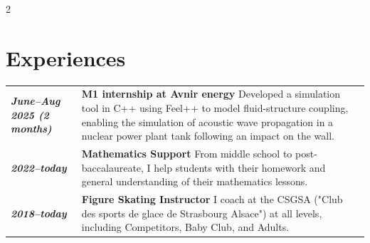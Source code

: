 \documentclass[lighthipster]{latex_for_CV/simplehipstercv}
\begin{document}
\begin{paracol}{2}















\vspace{0.3cm}



\small
\section*{Experiences}

\begin{tabular}{>{\raggedleft\arraybackslash}p{2.5cm} | >{\footnotesize}p{} c}
    \textit{{\textbf{\color{gray!130} June--Aug 2025 (2 months)}}} & {\small\textbf{M1 internship at Avnir energy}} \newline Developed a simulation tool in C++ using Feel++ to model fluid-structure coupling, enabling the simulation of acoustic wave propagation in a nuclear power plant tank following an impact on the wall.  & \\[1.05cm]
    \textit{{\textbf{\color{gray!130} 2022--today}}} & {\small\textbf{ Mathematics Support}} \newline From middle school to post-baccalaureate, I help students with their homework and general understanding of their mathematics lessons. & \\[0.75cm]
    \textit{{\textbf{\color{gray!130} 2018--today}}} & {\small\textbf{ Figure Skating Instructor}} \newline I coach at the CSGSA ("Club des sports de glace de Strasbourg Alsace") at all levels, including Competitors, Baby Club, and Adults. & \\
\end{tabular}



\end{paracol}
\end{document}

